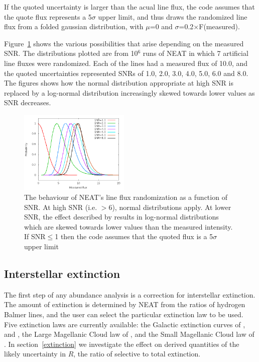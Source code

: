 \documentclass[useAMS,usenatbib]{mn2e}
\begin{document}
If the quoted uncertainty is larger than the acual line flux, the code assumes that the quote flux represents a 5$\sigma$ upper limit, and thus draws the randomized line flux from a folded gaussian distribution, with $\mu$=0 and $\sigma$=0.2$\times$F(measured).

Figure~\ref{distributions} shows the various possibilities that arise depending on the measured SNR.  The distributions plotted are from 10$^6$ runs of NEAT in which 7 artificial line fluxes were randomized.  Each of the lines had a measured flux of 10.0, and the quoted uncertainties represented SNRs of 1.0, 2.0, 3.0, 4.0, 5.0, 6.0 and 8.0.  The figures shows how the normal distribution appropriate at high SNR is replaced by a log-normal distribution increasingly skewed towards lower values as SNR decreases.

\begin{figure}
\label{distributions}
\includegraphics[width=0.47\textwidth]{figures/distributions_2.png}
\caption{The behaviour of NEAT's line flux randomization as a function of SNR.  At high SNR (i.e. $>$6), normal distributions apply.  At lower SNR, the effect described by \citet{1994A&A...287..676R} results in log-normal distributions which are skewed towards lower values than the measured intensity.  If SNR$\leq$1 then the code assumes that the quoted flux is a 5$\sigma$ upper limit}
\end{figure}

\subsection{Interstellar extinction}

The first step of any abundance analysis is a correction for interstellar extinction.  The amount of extinction is determined by NEAT from the ratios of hydrogen Balmer lines, and the user can select the particular extinction law to be used.  Five extinction laws are currently available: the Galactic extinction curves of \citet{1983MNRAS.203..301H}, \citet{1990ApJS...72..163F} and \citet{1989ApJ...345..245C}, the Large Magellanic Cloud law of \citet{1983MNRAS.203..301H}, and the Small Magellanic Cloud law of \citet{1984A&A...132..389P}.  In section~\ref{extinction} we investigate the effect on derived quantities of the likely uncertainty in $R$, the ratio of selective to total extinction.
\end{document}
